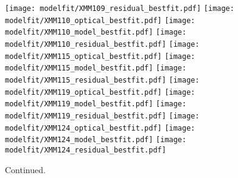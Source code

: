 \documentclass[iop]{emulateapj}
\begin{document}
\begin{figure*}[!tbp]
\begin{centering}
\texttt{[image: modelfit/XMM109\_residual\_bestfit.pdf]}
\texttt{[image: modelfit/XMM110\_optical\_bestfit.pdf]}
\texttt{[image: modelfit/XMM110\_model\_bestfit.pdf]}
\texttt{[image: modelfit/XMM110\_residual\_bestfit.pdf]}
\texttt{[image: modelfit/XMM115\_optical\_bestfit.pdf]}
\texttt{[image: modelfit/XMM115\_model\_bestfit.pdf]}
\texttt{[image: modelfit/XMM115\_residual\_bestfit.pdf]}
\texttt{[image: modelfit/XMM119\_optical\_bestfit.pdf]}
\texttt{[image: modelfit/XMM119\_model\_bestfit.pdf]}
\texttt{[image: modelfit/XMM119\_residual\_bestfit.pdf]}
\texttt{[image: modelfit/XMM124\_optical\_bestfit.pdf]}
\texttt{[image: modelfit/XMM124\_model\_bestfit.pdf]}
\texttt{[image: modelfit/XMM124\_residual\_bestfit.pdf]}
\end{centering}

\caption{ Continued.}
\addtocounter{figure}{-1}

\end{figure*}



\end{document}

